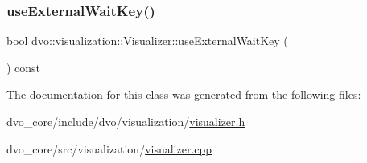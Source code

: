 \subsubsection{\texorpdfstring{use\+External\+Wait\+Key()}{useExternalWaitKey()}\hspace{0.1cm}{\footnotesize\ttfamily [2/2]}}
{\footnotesize\ttfamily bool dvo\+::visualization\+::\+Visualizer\+::use\+External\+Wait\+Key (\begin{DoxyParamCaption}{ }\end{DoxyParamCaption}) const}



The documentation for this class was generated from the following files\+:\begin{DoxyCompactItemize}
\item 
dvo\+\_\+core/include/dvo/visualization/\mbox{\hyperlink{visualizer_8h}{visualizer.\+h}}\item 
dvo\+\_\+core/src/visualization/\mbox{\hyperlink{visualizer_8cpp}{visualizer.\+cpp}}\end{DoxyCompactItemize}
